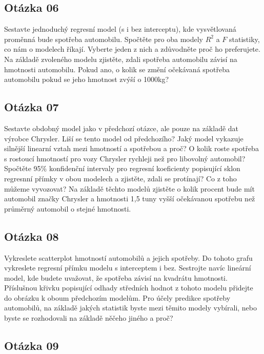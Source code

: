 \documentclass[
]{article}
\begin{document}
\hypertarget{otuxe1zka-06}{%
\subsection{Otázka 06}\label{otuxe1zka-06}}

Sestavte jednoduchý regresní model (s i bez interceptu), kde
vysvětlovaná proměnná bude spotřeba automobilu. Spočtěte pro oba modely
\(R^2\) a \(F\) statistiky, co nám o modelech říkají. Vyberte jeden z
nich a zdůvodněte proč ho preferujete. Na základě zvoleného modelu
zjistěte, zdali spotřeba automobilu závisí na hmotnosti automobilu.
Pokud ano, o kolik se změní očekávaná spotřeba automobilu pokud se jeho
hmotnost zvýší o 1000kg?

\hypertarget{otuxe1zka-07}{%
\subsection{Otázka 07}\label{otuxe1zka-07}}

Sestavte obdobný model jako v předchozí otázce, ale pouze na základě dat
výrobce Chrysler. Liší se tento model od předchozího? Jaký model
vykazuje silnější linearní vztah mezi hmotností a spotřebou a proč? O
kolik roste spotřeba s rostoucí hmotností pro vozy Chrysler rychleji než
pro libovolný automobil? Spočtěte 95\% konfidenční intervaly pro
regresní koeficienty popisující sklon regresnní přímky v obou modelech a
zjistěte, zdali se protínají? Co z toho můžeme vyvozovat? Na základě
těchto modelů zjistěte o kolik procent bude mít automobil značky
Chrysler a hmotnosti 1,5 tuny vyšší očekávanou spotřebu než průměrný
automobil o stejné hmotnosti.

\hypertarget{otuxe1zka-08}{%
\subsection{Otázka 08}\label{otuxe1zka-08}}

Vykreslete scatterplot hmotností automobilů a jejich spotřeby. Do tohoto
grafu vykreslete regresní přímku modelu s interceptem i bez. Sestrojte
navíc lineární model, kde budete uvažovat, že spotřeba závisí na
kvadrátu hmotnosti. Příslušnou křivku popisující odhady středních hodnot
z tohoto modelu přidejte do obrázku k oboum předchozím modelům. Pro
účely predikce spotřeby automobilů, na základě jakých statistik byste
mezi těmito modely vybírali, nebo byste se rozhodovali na základě něčeho
jiného a proč?

\hypertarget{otuxe1zka-09}{%
\subsection{Otázka 09}\label{otuxe1zka-09}}
\end{document}
